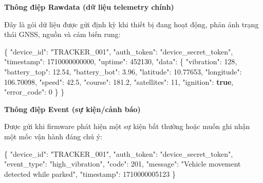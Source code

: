 \documentclass[a4paper]{extarticle}
\newenvironment{Shaded}{}{}
\newcommand{\DataTypeTok}[1]{\textcolor[rgb]{0.56,0.13,0.00}{#1}}
\newcommand{\DecValTok}[1]{\textcolor[rgb]{0.25,0.63,0.44}{#1}}
\newcommand{\FloatTok}[1]{\textcolor[rgb]{0.25,0.63,0.44}{#1}}
\newcommand{\FunctionTok}[1]{\textcolor[rgb]{0.02,0.16,0.49}{#1}}
\newcommand{\KeywordTok}[1]{\textcolor[rgb]{0.00,0.44,0.13}{\textbf{#1}}}
\newcommand{\StringTok}[1]{\textcolor[rgb]{0.25,0.44,0.63}{#1}}
\begin{document}
\textbf{Thông điệp Rawdata (dữ liệu telemetry chính)}

Đây là gói dữ liệu được gửi định kỳ khi thiết bị đang hoạt động, phản
ánh trạng thái GNSS, nguồn và cảm biến rung:

\begin{Shaded}
\begin{Highlighting}[]
\FunctionTok{\{}
  \DataTypeTok{"device\_id"}\FunctionTok{:} \StringTok{"TRACKER\_001"}\FunctionTok{,}
  \DataTypeTok{"auth\_token"}\FunctionTok{:} \StringTok{"device\_secret\_token"}\FunctionTok{,}
  \DataTypeTok{"timestamp"}\FunctionTok{:} \DecValTok{1710000000000}\FunctionTok{,}
  \DataTypeTok{"uptime"}\FunctionTok{:} \DecValTok{452130}\FunctionTok{,}
  \DataTypeTok{"data"}\FunctionTok{:} \FunctionTok{\{}
    \DataTypeTok{"vibration"}\FunctionTok{:} \DecValTok{128}\FunctionTok{,}
    \DataTypeTok{"battery\_top"}\FunctionTok{:} \FloatTok{12.54}\FunctionTok{,}
    \DataTypeTok{"battery\_bot"}\FunctionTok{:} \FloatTok{3.96}\FunctionTok{,}
    \DataTypeTok{"latitude"}\FunctionTok{:} \FloatTok{10.77653}\FunctionTok{,}
    \DataTypeTok{"longitude"}\FunctionTok{:} \FloatTok{106.70098}\FunctionTok{,}
    \DataTypeTok{"speed"}\FunctionTok{:} \FloatTok{42.5}\FunctionTok{,}
    \DataTypeTok{"course"}\FunctionTok{:} \FloatTok{181.2}\FunctionTok{,}
    \DataTypeTok{"satellites"}\FunctionTok{:} \DecValTok{11}\FunctionTok{,}
    \DataTypeTok{"ignition"}\FunctionTok{:} \KeywordTok{true}\FunctionTok{,}
    \DataTypeTok{"error\_code"}\FunctionTok{:} \DecValTok{0}
  \FunctionTok{\}}
\FunctionTok{\}}
\end{Highlighting}
\end{Shaded}

\textbf{Thông điệp Event (sự kiện/cảnh báo)}

Được gửi khi firmware phát hiện một sự kiện bất thường hoặc muốn ghi
nhận một mốc vận hành đáng chú ý:

\begin{Shaded}
\begin{Highlighting}[]
\FunctionTok{\{}
  \DataTypeTok{"device\_id"}\FunctionTok{:} \StringTok{"TRACKER\_001"}\FunctionTok{,}
  \DataTypeTok{"auth\_token"}\FunctionTok{:} \StringTok{"device\_secret\_token"}\FunctionTok{,}
  \DataTypeTok{"event\_type"}\FunctionTok{:} \StringTok{"high\_vibration"}\FunctionTok{,}
  \DataTypeTok{"code"}\FunctionTok{:} \DecValTok{201}\FunctionTok{,}
  \DataTypeTok{"message"}\FunctionTok{:} \StringTok{"Vehicle movement detected while parked"}\FunctionTok{,}
  \DataTypeTok{"timestamp"}\FunctionTok{:} \DecValTok{1710000005123}
\FunctionTok{\}}
\end{Highlighting}
\end{Shaded}
\end{document}

